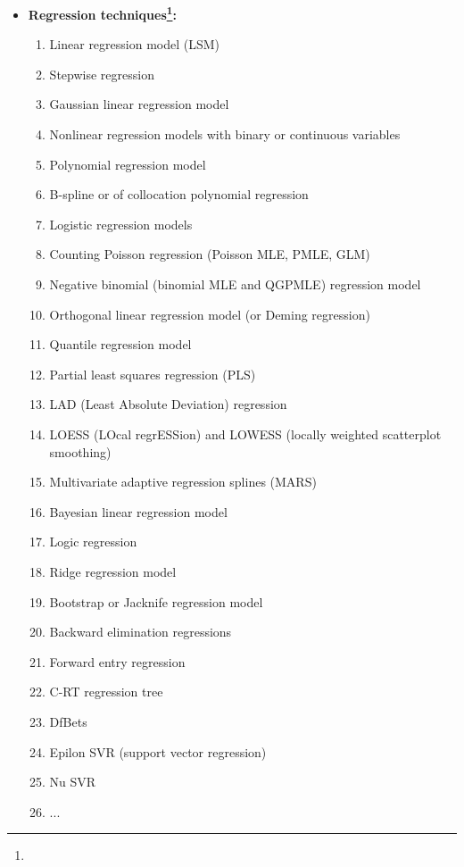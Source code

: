 \begin{itemize}
		\item \textbf{Regression techniques\footnote{}:}
		\begin{multicols}{2}
		\begin{enumerate}
			\item Linear regression model (LSM)
			\item Stepwise regression
			\item Gaussian linear regression model		
			\item Nonlinear regression models with binary or continuous variables 
			\item Polynomial regression model 
			\item B-spline or of collocation polynomial regression		
			\item Logistic regression models
			\item Counting Poisson regression (Poisson MLE, PMLE, GLM) 
			\item Negative binomial (binomial MLE and QGPMLE) regression model		
			\item Orthogonal linear regression model (or Deming regression)		
			\item Quantile regression model	
			\item Partial least squares regression (PLS)
			\item LAD (Least Absolute Deviation) regression 		
			\item LOESS (LOcal regrESSion) and LOWESS (locally weighted scatterplot smoothing)		
			\item Multivariate adaptive regression splines (MARS)		
			\item Bayesian linear regression model
			\item Logic regression
			\item Ridge regression model 		
			\item Bootstrap or Jacknife regression model
			\item Backward elimination regressions
			\item Forward entry regression
			\item C-RT regression tree
			\item DfBets
			\item Epilon SVR (support vector regression)
			\item Nu SVR
			\item ...
		\end{enumerate}
		\end{multicols}
		

\end{itemize}
